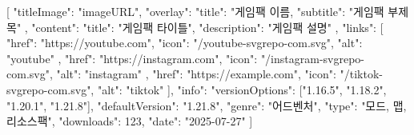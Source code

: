 [
  {
      "titleImage": "imageURL",
      "overlay": {
        "title": "게임팩 이름,
        "subtitle": "게임팩 부제목"
      },
      "content": {
        "title": "게임팩 타이틀",
        "description": "게임팩 설명"
      },
      "links": [
        { "href": "https://youtube.com", "icon": "/youtube-svgrepo-com.svg", "alt": "youtube" },
        { "href": "https://instagram.com", "icon": "/instagram-svgrepo-com.svg", "alt": "instagram" },
        { "href": "https://example.com", "icon": "/tiktok-svgrepo-com.svg", "alt": "tiktok" }
      ],
      "info": {
        "versionOptions": ["1.16.5", "1.18.2", "1.20.1", "1.21.8"],
        "defaultVersion": "1.21.8",
        "genre": "어드벤처",
        "type": "모드, 맵, 리소스팩",
        "downloads": 123,
        "date": "2025-07-27"
      }
    }
]